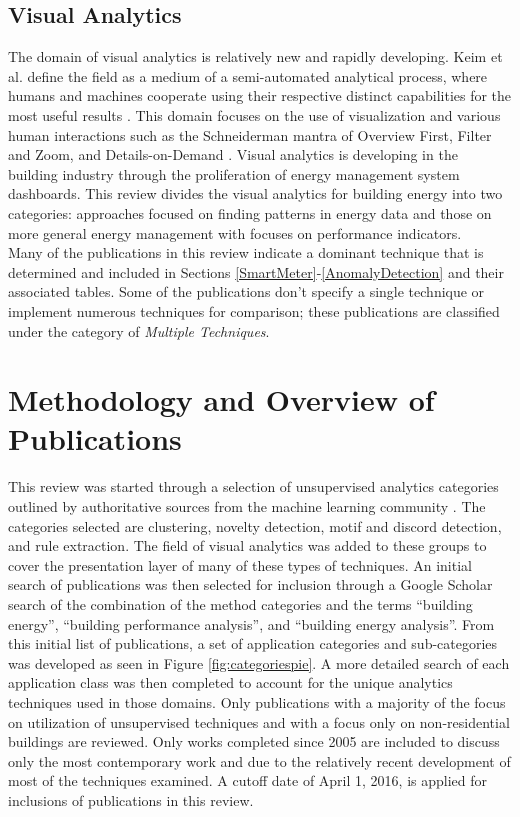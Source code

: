\documentclass[preprint,12pt,3p]{elsarticle}
\begin{document}
\subsection{Visual Analytics}
The domain of visual analytics is relatively new and rapidly developing. Keim et al. define the field as a medium of a semi-automated analytical process, where humans and machines cooperate using their respective distinct capabilities for the most useful results \cite{keim_visual_2008}. This domain focuses on the use of visualization and various human interactions such as the Schneiderman mantra of Overview First, Filter and Zoom, and Details-on-Demand \cite{shneiderman_eyes_1996}. Visual analytics is developing in the building industry through the proliferation of energy management system dashboards. This review divides the visual analytics for building energy into two categories: approaches focused on finding patterns in energy data and those on more general energy management with focuses on performance indicators.\\

Many of the publications in this review indicate a dominant technique that is determined and included in Sections \ref{SmartMeter}-\ref{AnomalyDetection} and their associated tables. Some of the publications don't specify a single technique or implement numerous techniques for comparison; these publications are classified under the category of \emph{Multiple Techniques}.

\section{Methodology and Overview of Publications}
\label{Overview}
This review was started through a selection of unsupervised analytics categories outlined by authoritative sources from the machine learning community \citep{hastie_elements_2009,james_introduction_2013,duda_pattern_2012,mirkin_clustering:_2012}. The categories selected are clustering, novelty detection, motif and discord detection, and rule extraction. The field of visual analytics was added to these groups to cover the presentation layer of many of these types of techniques. An initial search of publications was then selected for inclusion through a Google Scholar search of the combination of the method categories and the terms ``building energy'', ``building performance analysis'', and ``building energy analysis''. From this initial list of publications, a set of application categories and sub-categories was developed as seen in Figure \ref{fig:categoriespie}. A more detailed search of each application class was then completed to account for the unique analytics techniques used in those domains. Only publications with a majority of the focus on utilization of unsupervised techniques and with a focus only on non-residential buildings are reviewed. Only works completed since 2005 are included to discuss only the most contemporary work and due to the relatively recent development of most of the techniques examined. A cutoff date of April 1, 2016, is applied for inclusions of publications in this review.
\end{document}

